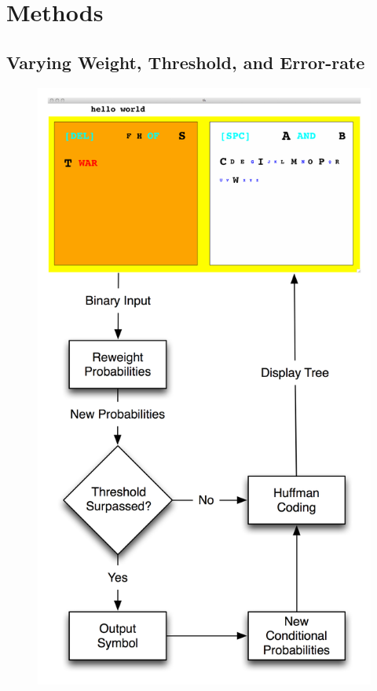 \documentclass[12pt,titlepage]{article}
\begin{document}
\section{Methods}

\subsection{Varying Weight, Threshold, and Error-rate}

\begin{figure}[t]
\begin{center}
	\includegraphics[scale=0.60]{fig11.jpg}
	\label{fig:BinFlow}
\end{center}
\end{figure}
\end{document}
